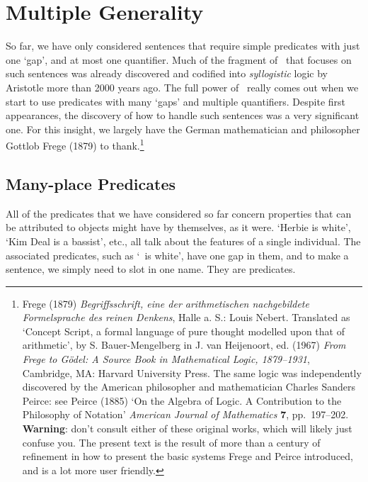 \chapter{Multiple Generality}\label{s:MultipleGenerality}
So far, we have only considered sentences that require simple predicates with just one `gap', and at most one quantifier. Much of the fragment of \FOL\ that focuses on such sentences was already discovered and codified into \emph{syllogistic} logic by Aristotle more than 2000 years ago. The full power of \FOL\ really comes out when we start to use predicates with many `gaps' and multiple quantifiers. Despite first appearances, the discovery of how to handle such sentences was a very significant one.  For this insight, we largely have the German mathematician and philosopher Gottlob Frege (1879) to thank.\footnote{Frege (1879) \emph{Begriffsschrift, eine der arithmetischen nachgebildete Formelsprache des reinen Denkens}, Halle a. S.: Louis Nebert. Translated as `Concept Script, a formal language of pure thought modelled upon that of arithmetic', by S. Bauer-Mengelberg in J. van Heijenoort, ed. (1967) \emph{From Frege to Gödel: A Source Book in Mathematical Logic, 1879–1931}, Cambridge, MA: Harvard University Press. The same logic was independently discovered by the American philosopher and mathematician Charles Sanders Peirce: see Peirce (1885) `On the Algebra of Logic. A Contribution to the Philosophy of Notation' \emph{American Journal of Mathematics} \textbf{7}, pp.\ 197–202. \textbf{Warning}: don't consult either of these original works, which will likely just confuse you. The present text is the result of more than a century of refinement in how to present the basic systems Frege and Peirce introduced, and is a lot more user friendly.}



\section{Many-place Predicates}
All of the predicates that we have considered so far concern properties that can be attributed to objects might have by themselves, as it were. `Herbie is white', `Kim Deal is a bassist', etc., all talk about the features of a single individual. The associated predicates, such as `\blank\ is white', have one gap in them, and to make a sentence, we simply need to slot in one name. They are  predicates. 

